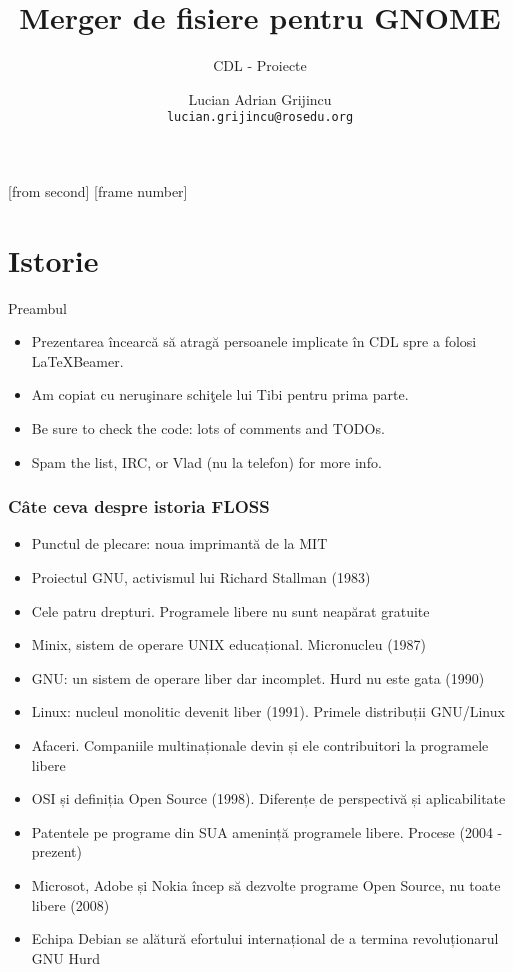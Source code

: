 \documentclass{beamer}
\title{Merger de fisiere pentru GNOME}
\subtitle{CDL - Proiecte}
\institute{ROSEdu}
\author{Lucian Adrian Grijincu \\ \texttt{lucian.grijincu@rosedu.org}}
\begin{document}
[from second]
[frame number]

\frame{\titlepage}

\frame{\tableofcontents}

\section{Istorie}

\frame{\tableofcontents[currentsection]}

\begin{frame}{Preambul}
\begin{itemize} %
\item Prezentarea încearcă să atragă persoanele implicate în CDL spre a folosi
\LaTeX Beamer.
\item Am copiat cu neruşinare schiţele lui Tibi pentru prima parte.
\item Be sure to check the code: lots of comments and TODOs.
\item Spam the list, IRC, or Vlad (nu la telefon) for more info.
\end{itemize}
\end{frame}

\begin{frame}[allowframebreaks] %
\frametitle{Câte ceva despre istoria FLOSS}
\begin{itemize}
\item Punctul de plecare: noua imprimantă de la MIT
\item Proiectul GNU, activismul lui Richard Stallman (1983)
\item Cele patru drepturi. Programele libere nu sunt neapărat gratuite
\item Minix, sistem de operare UNIX educațional. Micronucleu (1987)
\item GNU: un sistem de operare liber dar incomplet. Hurd nu este gata (1990)
\item Linux: nucleul monolitic devenit liber (1991). Primele distribuții
GNU/Linux
\item Afaceri. Companiile multinaționale devin și ele contribuitori la
programele libere
\item OSI și definiția Open Source (1998). Diferențe de perspectivă și
aplicabilitate
\item Patentele pe programe din SUA amenință programele libere. Procese (2004
- prezent)
\item Microsot, Adobe și Nokia încep să dezvolte programe Open Source, nu
toate libere (2008)
\item Echipa Debian se alătură efortului internațional de a termina
revoluționarul GNU Hurd
\end{itemize}
\end{frame}
\end{document}
